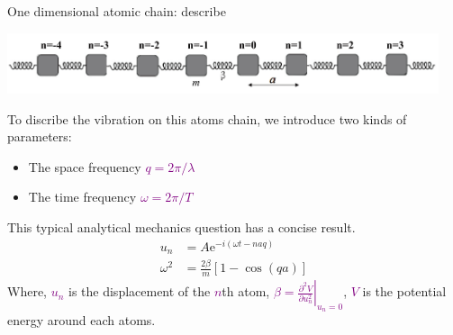 \documentclass{beamer}
\begin{document}
\begin{frame}{One dimensional atomic chain: describe}\small
  \begin{center}
    \includegraphics[width=0.95\textwidth]{figure/atom_chain.png}
  \end{center}
  \begin{block}{}
    To discribe the vibration on this atoms chain, we introduce two kinds of parameters: 
    \begin{itemize}
      \item The space frequency \textcolor{purple}{\(q=2\pi/\lambda\)}
      \item The time frequency \textcolor{purple}{\(\omega = 2\pi/T\)}
    \end{itemize}
  \end{block}
  This typical analytical mechanics question has a concise result.
  \begin{subequations}\begin{align}
      u_n &= A\mathrm{e}^{-i(\omega{}t-naq)}\\
      \omega^2 &= \frac{2\beta}{m}[1-\cos(qa)]
  \end{align}\end{subequations}
  Where, \textcolor{purple}{\(u_n\)} is the displacement of the \textcolor{purple}{\(n\)}th atom, \textcolor{purple}{\(\beta = \left.\frac{\partial^2{}V}{\partial{}u_n^2}\right|_{u_n=0}\)}, \textcolor{purple}{\(V\)} is the potential energy around each atoms.
\end{frame}
\end{document}
